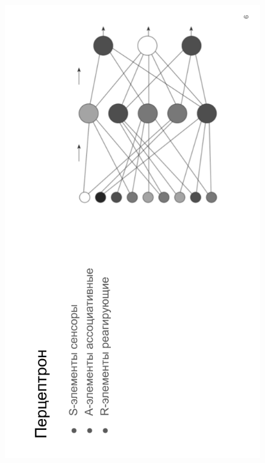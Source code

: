 \begin{figure}[H]
	\begin{center}
		\includegraphics[scale=0.7]{inc/img/slide6.png}
	\end{center}
\end{figure}
